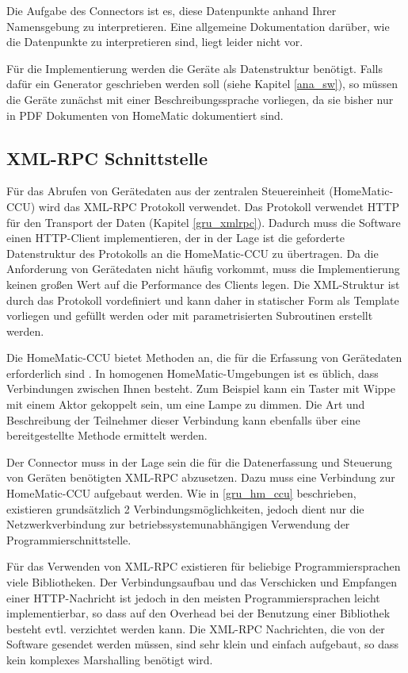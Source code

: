Die Aufgabe des Connectors ist es, diese Datenpunkte anhand Ihrer Namensgebung zu interpretieren.
Eine allgemeine Dokumentation darüber, wie die Datenpunkte zu interpretieren sind, liegt leider
nicht vor.

Für die Implementierung werden die Geräte als Datenstruktur benötigt.
Falls dafür ein Generator geschrieben werden soll (siehe Kapitel \ref{ana_sw}), so müssen
die Geräte zunächst mit einer Beschreibungssprache vorliegen, da sie bisher nur in
PDF Dokumenten von HomeMatic dokumentiert sind.

\subsection{XML-RPC Schnittstelle}
\label{ana_hm_xmlrpc}

Für das Abrufen von Gerätedaten aus der zentralen Steuereinheit (HomeMatic-CCU) wird das XML-RPC
Protokoll verwendet.
Das Protokoll verwendet HTTP für den Transport der Daten (Kapitel \ref{gru_xmlrpc}).
Dadurch muss die Software einen HTTP-Client implementieren, der in der Lage ist die geforderte
Datenstruktur des Protokolls an die HomeMatic-CCU zu übertragen.
Da die Anforderung von Gerätedaten nicht häufig vorkommt, muss die Implementierung keinen großen
Wert auf die Performance des Clients legen.
Die XML-Struktur ist durch das Protokoll vordefiniert und kann daher in statischer Form als
Template vorliegen und gefüllt werden oder mit parametrisierten Subroutinen erstellt werden.

Die HomeMatic-CCU bietet Methoden an, die für die Erfassung von Gerätedaten erforderlich
sind \cite{homematic_xmlrpc}.
In homogenen HomeMatic-Umgebungen ist es üblich, dass Verbindungen zwischen Ihnen besteht.
Zum Beispiel kann ein Taster mit Wippe mit einem Aktor gekoppelt sein, um eine Lampe zu dimmen.
Die Art und Beschreibung der Teilnehmer dieser Verbindung kann ebenfalls über eine
bereitgestellte Methode ermittelt werden.

Der Connector muss in der Lage sein die für die Datenerfassung und Steuerung von Geräten benötigten
XML-RPC abzusetzen.
Dazu muss eine Verbindung zur HomeMatic-CCU aufgebaut werden.
Wie in \ref{gru_hm_ccu} beschrieben, existieren grundsätzlich 2 Verbindungsmöglichkeiten, jedoch
dient nur die Netzwerkverbindung zur betriebssystemunabhängigen Verwendung der Programmierschnittstelle.

Für das Verwenden von XML-RPC existieren für beliebige Programmiersprachen viele Bibliotheken.
Der Verbindungsaufbau und das Verschicken und Empfangen einer HTTP-Nachricht ist jedoch in
den meisten Programmiersprachen leicht implementierbar, so dass auf den Overhead bei der Benutzung
einer Bibliothek besteht evtl. verzichtet werden kann.
Die XML-RPC Nachrichten, die von der Software gesendet werden müssen, sind sehr klein und einfach
aufgebaut, so dass kein komplexes Marshalling benötigt wird.

